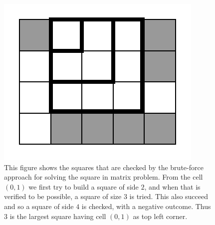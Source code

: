 \begin{figure}
	\centering
	\label{fig:square_in_matrix:squa_matrix_incremental}
	\includegraphics[width=\textwidth/2]{sources/square_in_matrix/images/squa_matrix_incremental}
	\caption[Square in matrix - Brute-force incremental square construction.]{This figure shows  the
	squares that are checked by the brute-force approach for solving the square in matrix problem.
	From the cell $(0,1)$ we first try to build a square of side $2$, and when that is verified to
	be possible, a square of size $3$ is tried. This also succeed and so a square of side $4$ is
	checked, with a negative outcome. Thus $3$ is the largest square having cell $(0,1)$ as top left
	corner. }
\end{figure}

